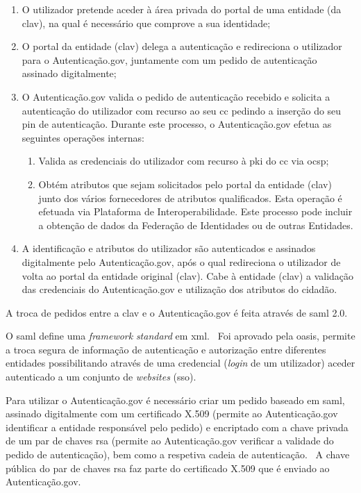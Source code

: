 \begin{enumerate}
    \item O utilizador pretende aceder à área privada do portal de uma entidade (da \acrshort{clav}), na qual 
    é necessário que comprove a sua identidade;
    \item O portal da entidade (\acrshort{clav}) delega a autenticação e redireciona o utilizador para o 
    Autenticação.gov, juntamente com um pedido de autenticação assinado digitalmente;
    \item O Autenticação.gov valida o pedido de autenticação recebido e solicita a autenticação do utilizador 
    com recurso ao seu \acrshort{cc} pedindo a inserção do seu \acrshort{pin} de autenticação. 
    Durante este processo, o Autenticação.gov efetua as seguintes operações internas:
    \begin{enumerate}
        \item Valida as credenciais do utilizador com recurso à \acrshort{pki} do \acrshort{cc} 
        via \acrshort{ocsp};
        \item Obtém atributos que sejam solicitados pelo portal da entidade (\acrshort{clav}) junto dos vários 
        fornecedores de atributos qualificados. Esta operação é efetuada via Plataforma de Interoperabilidade. 
        Este processo pode incluir a obtenção de dados da Federação de Identidades ou de outras Entidades.
    \end{enumerate}

    \item A identificação e atributos do utilizador são autenticados e assinados digitalmente pelo 
    Autenticação.gov, após o qual redireciona o utilizador de volta ao portal da entidade original (\acrshort{clav}). Cabe à entidade (\acrshort{clav}) a validação das credenciais do Autenticação.gov e utilização dos atributos do cidadão.
\end{enumerate}

A troca de pedidos entre a \acrshort{clav} e o Autenticação.gov é feita através de \acrshort{saml} 2.0.

O \acrfull{saml} define uma \textit{framework} \textit{standard} em \acrshort{xml}.~\cite{sam2man} 
Foi aprovado pela \acrshort{oasis}, permite a troca segura de informação de autenticação e autorização entre 
diferentes entidades possibilitando através de uma credencial (\textit{login} de um utilizador) aceder autenticado 
a um conjunto de \textit{websites} (\acrshort{sso}).

Para utilizar o Autenticação.gov é necessário criar um pedido baseado em \acrshort{saml}, assinado digitalmente 
com um certificado X.509 (permite ao Autenticação.gov identificar a entidade responsável pelo pedido) e encriptado 
com a chave privada de um par de chaves \acrshort{rsa} (permite ao Autenticação.gov verificar a validade do 
pedido de autenticação), bem como a respetiva cadeia de autenticação.~\cite{otavioTese} 
A chave pública do par de chaves \acrshort{rsa} faz parte do certificado X.509 que é enviado ao Autenticação.gov.

